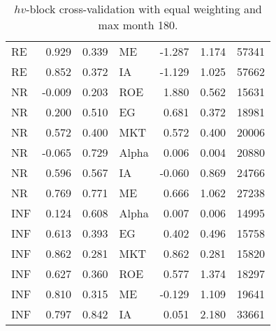 \begin{table}[ht]
{\begin{tabular}{lrrlrrr}
			RE & 0.929 & 0.339 & ME & -1.287 & 1.174 & 57341 \\ 
			RE & 0.852 & 0.372 & IA & -1.129 & 1.025 & 57662 \\ 
			\hline
			NR & -0.009 & 0.203 & ROE & 1.880 & 0.562 & 15631 \\ 
			NR & 0.200 & 0.510 & EG & 0.681 & 0.372 & 18981 \\ 
			NR & 0.572 & 0.400 & MKT & 0.572 & 0.400 & 20006 \\ 
			NR & -0.065 & 0.729 & Alpha & 0.006 & 0.004 & 20880 \\ 
			NR & 0.596 & 0.567 & IA & -0.060 & 0.869 & 24766 \\ 
			NR & 0.769 & 0.771 & ME & 0.666 & 1.062 & 27238 \\ 
			\hline
			INF & 0.124 & 0.608 & Alpha & 0.007 & 0.006 & 14995 \\ 
			INF & 0.613 & 0.393 & EG & 0.402 & 0.496 & 15758 \\ 
			INF & 0.862 & 0.281 & MKT & 0.862 & 0.281 & 15820 \\ 
			INF & 0.627 & 0.360 & ROE & 0.577 & 1.374 & 18297 \\ 
			INF & 0.810 & 0.315 & ME & -0.129 & 1.109 & 19641 \\ 
			INF & 0.797 & 0.842 & IA & 0.051 & 2.180 & 33661 \\ 
			\hline
			\hline
		\end{tabular}
	}
	\caption{$hv$-block cross-validation with equal weighting and max month 180.} 
	\label{tab:cv_180_EW_VYP_SL}
\end{table}

